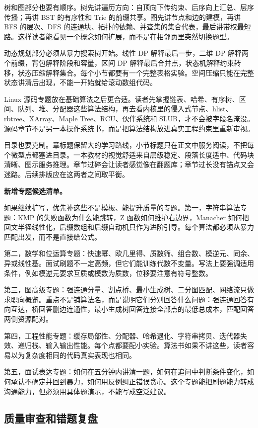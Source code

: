 树和图部分也要有顺序。树先讲遍历方向：自顶向下传约束、后序向上汇总、层序传播；再讲 BST 的有序性和 Trie 的前缀共享。图先讲节点和边的建模，再讲 BFS 的层次、DFS 的连通块、拓扑的依赖、并查集的集合代表，最后讲带权最短路。这样读者能看见一个概念如何扩展，而不是在相邻页里突然切换题型。

动态规划部分必须从暴力搜索树开始。线性 DP 解释最后一步，二维 DP 解释两个前缀，背包解释阶段和容量，区间 DP 解释最后合并点，状态机解释约束转移，状态压缩解释集合。每个小节都要有一个完整表格实验。空间压缩只能在完整状态讲清后出现，不能一开始就给滚动数组代码。

Linux 源码专题放在基础算法之后更合适。读者先掌握链表、哈希、有序树、区间、队列、堆、分配器这些算法结构，再去看内核里的侵入式节点、hlist、rbtree、XArray、Maple Tree、RCU、伙伴系统和 SLUB，才不会被字段名淹没。源码章节不是另一本操作系统书，而是把算法结构放进真实工程约束里重新审视。

目录也要克制。章标题保留大的学习路线，小节标题只在正文中服务阅读，不把每个微型点都塞进目录。一本教材的视觉舒适来自层级稳定、段落长度适中、代码块清晰、图示服务推理。章节过碎会让读者感觉像在翻题库；章节过长没有锚点又会迷路。后续排版应在这两者之间取平衡。

\noindent\textbf{新增专题候选清单。}

如果继续扩写，优先补这些不是模板、能提升质量的专题。第一，字符串算法专题：KMP 的失败函数为什么能跳转，Z 函数如何维护右边界，Manacher 如何把回文半径线性化，后缀数组和后缀自动机只作为进阶引导。每个算法都必须从暴力匹配出发，而不是直接给公式。

第二，数学和位运算专题：快速幂、欧几里得、质数筛、组合数、模逆元、同余、异或线性基。面试刷题不一定高频，但它们能训练代数不变量。写法上要强调适用条件，例如模逆元要求互质或模数为质数，位移要注意有符号整数。

第三，图高级专题：强连通分量、割点桥、最小生成树、二分图匹配、网络流只做求职向概览。重点不是铺算法名，而是说明它们分别回答什么问题：强连通回答有向互达，桥回答删边连通性，最小生成树回答连接全部点的最低总成本，匹配回答两侧资源配对。

第四，工程性能专题：缓存局部性、分配器、哈希退化、字符串拷贝、迭代器失效、递归栈、输入输出性能。每个点都要配小实验。算法书如果不讲这些，读者容易以为复杂度相同的代码真实表现也相同。

第五，面试表达专题：如何在五分钟内讲清一题，如何在追问中判断条件变化，如何承认不确定并回到暴力，如何用反例纠正错误贪心。这个专题能把刷题能力转成沟通能力，但必须用具体题演示，不能写成空泛建议。

\subsection{质量审查和错题复盘}

